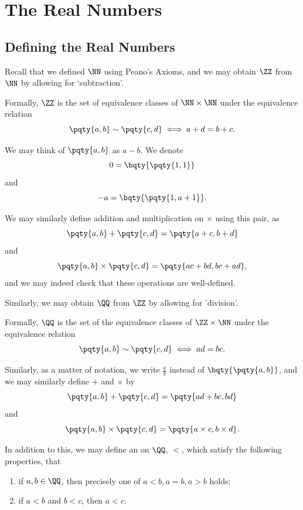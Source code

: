 \section{The Real Numbers}
\label{sec:real-numbers}

\subsection{Defining the Real Numbers}
\label{sec:defining-real-numbers}

Recall that we defined \(\NN\) using Peano's Axioms, and we may obtain \(\ZZ\) from \(\NN\) by allowing for `subtraction'.

\begin{definition}[\(\ZZ\)]
    Formally, \(\ZZ\) is the set of equivalence classes of \(\NN \times \NN\) under the equivalence relation
    \[
        \pqty{a, b} \sim \pqty{c, d} \iff a + d = b + c.
    \]
\end{definition}

We may think of \(\pqty{a, b}\) as \(a - b\). We denote
\[
    0 = \bqty{\pqty{1, 1}}
\]
and
\[
    -a = \bqty{\pqty{1, a + 1}}.
\]

We may similarly define addition and multiplication on \(\times\) using this pair, as
\[
    \pqty{a, b} + \pqty{c, d} = \pqty{a + c, b + d}
\]
and
\[
    \pqty{a, b} \times \pqty{c, d} = \pqty{ac + bd, bc + ad},
\]
and we may indeed check that these operations are well-defined.

Similarly, we may obtain \(\QQ\) from \(\ZZ\) by allowing for 'division'.

\begin{definition}[\(\QQ\)]
    Formally, \(\QQ\) is the set of the equivalence classes of \(\ZZ \times \NN\) under the equivalence relation
    \[
        \pqty{a, b} \sim \pqty{c, d} \iff ad = bc.
    \]
\end{definition}

Similarly, as a matter of notation, we write \(\frac{a}{b}\) instead of \(\bqty{\pqty{a, b}}\), and we may similarly define \(+\) and \(\times\) by
\[
    \pqty{a, b} + \pqty{c, d} = \pqty{ad + bc, bd}
\]
and
\[
    \pqty{a, b} \times \pqty{c, d} = \pqty{a \times c, b \times d}.
\]

In addition to this, we may define an  on \(\QQ\), \(<\), which satisfy the following properties, that
\begin{enumerate}
    \item if \(a, b \in \QQ\), then precisely one of \(a < b, a = b, a > b\) holds;
    \item if \(a < b\) and \(b < c\), then \(a < c\).
\end{enumerate}


